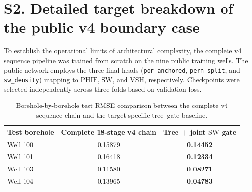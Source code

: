\documentclass[preprint,12pt,nopreprintline]{elsarticle}
\begin{document}
\section{S2. Detailed target breakdown of the public v4 boundary case}
\label{sec:supp-v4}
To establish the operational limits of architectural complexity, the complete v4 sequence pipeline was trained from scratch on the nine public training wells. The public network employs the three final heads (\texttt{por\_anchored}, \texttt{perm\_split}, and \texttt{sw\_density}) mapping to $\mathrm{PHIF}$, $\mathrm{SW}$, and $\mathrm{VSH}$, respectively. Checkpoints were selected independently across three folds based on validation loss.

\begin{table}[H]
\centering
\caption{Disaggregated target-level RMSE on the public Volve released test set.}
\label{tab:supp-v4-targets}
\small
{}
\end{table}

\begin{table}[H]
\centering
\caption{Borehole-by-borehole test RMSE comparison between the complete v4 sequence chain and the target-specific tree--gate baseline.}
\label{tab:supp-v4-wells}
\small
\begin{tabular}{lcc}
\toprule
Test borehole & Complete 18-stage v4 chain & Tree + joint $\mathrm{SW}$ gate \\
\midrule
Well 100 & 0.15879 & \textbf{0.14452} \\
Well 101 & 0.16418 & \textbf{0.12334} \\
Well 103 & 0.11580 & \textbf{0.08271} \\
Well 104 & 0.13965 & \textbf{0.04783} \\
\bottomrule
\end{tabular}
\end{table}
\end{document}
